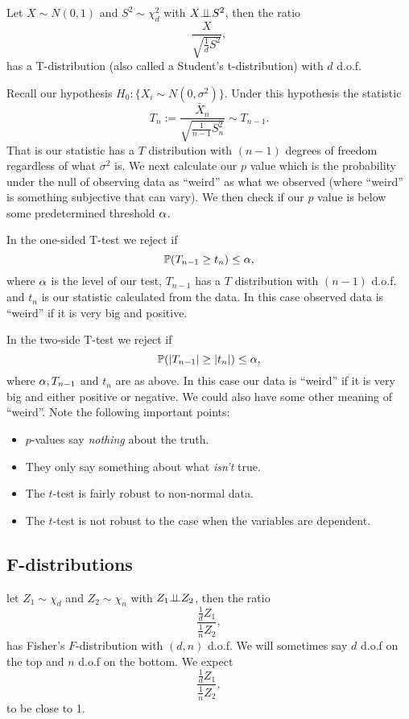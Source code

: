 \begin{defn}
Let $X \sim N(0,1)$ and $S^2 \sim \chi_d^2$ with $X {\perp\!\!\!\perp} S^2$, then the ratio 
\[\frac{X}{\sqrt{\frac{1}{d}S^2}}, \]
has a T-distribution (also called a Student's t-distribution) with $d$ d.o.f.
\end{defn}
Recall our hypothesis $H_0 : \{X_i \sim N(0,\sigma^2)\}$. Under this hypothesis the statistic 
\[T_n := \frac{\bar{X}_n}{\sqrt{\frac{1}{n-1}S_n^2}} \sim T_{n-1}. \]
That is our statistic has a $T$ distribution with $(n-1)$ degrees of freedom regardless of what $\sigma^2$ is. We next calculate our $p$ value which is the probability under the null of observing data as ``weird'' as what we observed (where ``weird'' is something subjective that can vary). We then check if our $p$ value is below some predetermined threshold ${\alpha}$. 

In the one-sided T-test we reject if 
\[{\mathbb{P}}(T_{n-1} \ge t_n) \le {\alpha}, \]
where ${\alpha}$ is the level of our test, $T_{n-1}$ has a $T$ distribution with $(n-1)$ d.o.f. and $t_n$ is our statistic calculated from the data. In this case observed data is ``weird'' if it is very big and positive.

In the two-side T-test we reject if
\[{\mathbb{P}}({\left\lvert T_{n-1}\right\rvert}\ge {\left\lvert t_n\right\rvert}) \le {\alpha}, \]
where ${\alpha}, T_{n-1}$ and $t_n$ are as above. In this case our data is ``weird'' if it is very big and either positive or negative. We could also have some other meaning of ``weird''. Note the following important points:
\begin{itemize}
    \item $p$-values say \emph{nothing} about the truth.
    \item They only say something about what \emph{isn't} true.
    \item The $t$-test is fairly robust to non-normal data.
    \item The $t$-test is not robust to the case when the variables are dependent.
\end{itemize}
\subsection{F-distributions}
let $Z_1 \sim \chi_d$ and $Z_2 \sim \chi_n$ with $Z_1 {\perp\!\!\!\perp} Z_2$, then the ratio
\[\frac{\frac{1}{d}Z_1}{\frac{1}{n}Z_2}, \]
has Fisher's $F$-distribution with $(d,n)$ d.o.f. We will sometimes say $d$ d.o.f on the top and $n$ d.o.f on the bottom. We expect 
\[\frac{\frac{1}{d}Z_1}{\frac{1}{n}Z_2}, \]
to be close to 1.

